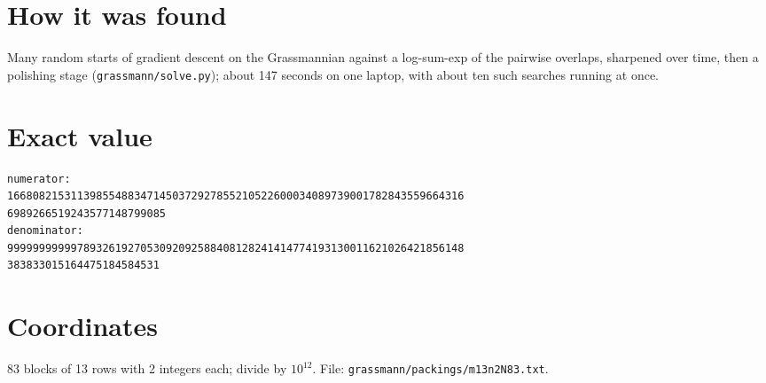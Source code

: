 \documentclass[11pt,a4paper]{article}
\begin{document}
\section{How it was found}
Many random starts of gradient descent on the Grassmannian against a log-sum-exp of the pairwise overlaps, sharpened over time, then a polishing stage (\texttt{grassmann/solve.py}); about 147 seconds on one laptop, with about ten such searches running at once.


\appendix
\section{Exact value}
{\small
\begin{verbatim}
numerator:
166808215311398554883471450372927855210522600034089739001782843559664316
6989266519243577148799085
denominator:
999999999997893261927053092092588408128241414774193130011621026421856148
383833015164475184584531
\end{verbatim}}

\section{Coordinates}
83 blocks of 13 rows with 2 integers each; divide by $10^{12}$. File: \texttt{grassmann/packings/m13n2N83.txt}.
{\tiny
\begin{multicols}{4}
\end{multicols}}
\end{document}
